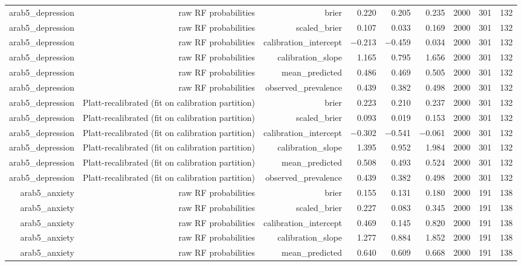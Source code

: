 \documentclass[10pt]{article}
\begin{document}
\begin{longtable}{rrrrrrrrr}
arab5\_depression & raw RF probabilities & brier & 0.220 & 0.205 & 0.235 & 2000 & 301 & 132 \\
arab5\_depression & raw RF probabilities & scaled\_brier & 0.107 & 0.033 & 0.169 & 2000 & 301 & 132 \\
arab5\_depression & raw RF probabilities & calibration\_intercept & $-$0.213 & $-$0.459 & 0.034 & 2000 & 301 & 132 \\
arab5\_depression & raw RF probabilities & calibration\_slope & 1.165 & 0.795 & 1.656 & 2000 & 301 & 132 \\
arab5\_depression & raw RF probabilities & mean\_predicted & 0.486 & 0.469 & 0.505 & 2000 & 301 & 132 \\
arab5\_depression & raw RF probabilities & observed\_prevalence & 0.439 & 0.382 & 0.498 & 2000 & 301 & 132 \\
arab5\_depression & Platt-recalibrated (fit on calibration partition) & brier & 0.223 & 0.210 & 0.237 & 2000 & 301 & 132 \\
arab5\_depression & Platt-recalibrated (fit on calibration partition) & scaled\_brier & 0.093 & 0.019 & 0.153 & 2000 & 301 & 132 \\
arab5\_depression & Platt-recalibrated (fit on calibration partition) & calibration\_intercept & $-$0.302 & $-$0.541 & $-$0.061 & 2000 & 301 & 132 \\
arab5\_depression & Platt-recalibrated (fit on calibration partition) & calibration\_slope & 1.395 & 0.952 & 1.984 & 2000 & 301 & 132 \\
arab5\_depression & Platt-recalibrated (fit on calibration partition) & mean\_predicted & 0.508 & 0.493 & 0.524 & 2000 & 301 & 132 \\
arab5\_depression & Platt-recalibrated (fit on calibration partition) & observed\_prevalence & 0.439 & 0.382 & 0.498 & 2000 & 301 & 132 \\
arab5\_anxiety & raw RF probabilities & brier & 0.155 & 0.131 & 0.180 & 2000 & 191 & 138 \\
arab5\_anxiety & raw RF probabilities & scaled\_brier & 0.227 & 0.083 & 0.345 & 2000 & 191 & 138 \\
arab5\_anxiety & raw RF probabilities & calibration\_intercept & 0.469 & 0.145 & 0.820 & 2000 & 191 & 138 \\
arab5\_anxiety & raw RF probabilities & calibration\_slope & 1.277 & 0.884 & 1.852 & 2000 & 191 & 138 \\
arab5\_anxiety & raw RF probabilities & mean\_predicted & 0.640 & 0.609 & 0.668 & 2000 & 191 & 138 \\

\end{longtable}
\end{document}
